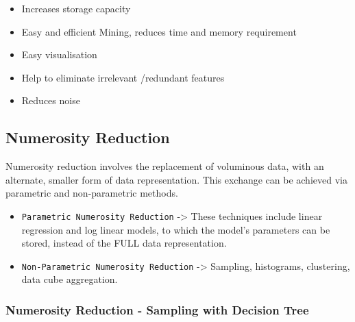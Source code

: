 \documentclass[11pt]{article}
\providecommand{\tightlist}{%
      \setlength{\itemsep}{0pt}\setlength{\parskip}{0pt}}
\begin{document}
\begin{itemize}
\tightlist
\item
  Increases storage capacity
\item
  Easy and efficient Mining, reduces time and memory requirement
\item
  Easy visualisation
\item
  Help to eliminate irrelevant /redundant features
\item
  Reduces noise
\end{itemize}

    \hypertarget{numerosity-reduction}{%
\subsection{Numerosity Reduction}\label{numerosity-reduction}}

Numerosity reduction involves the replacement of voluminous data, with
an alternate, smaller form of data representation. This exchange can be
achieved via parametric and non-parametric methods.

\begin{itemize}
\item
  \texttt{Parametric\ Numerosity\ Reduction} -\textgreater{} These
  techniques include linear regression and log linear models, to which
  the model's parameters can be stored, instead of the FULL data
  representation.
\item
  \texttt{Non-Parametric\ Numerosity\ Reduction} -\textgreater{}
  Sampling, histograms, clustering, data cube aggregation.
\end{itemize}

    \hypertarget{numerosity-reduction---sampling-with-decision-tree}{%
\subsubsection{Numerosity Reduction - Sampling with Decision
Tree}\label{numerosity-reduction---sampling-with-decision-tree}}
\end{document}
